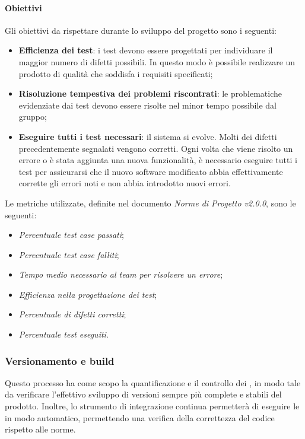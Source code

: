 \paragraph{Obiettivi} \Spazio
Gli obiettivi da rispettare durante lo sviluppo del progetto sono i seguenti:
\begin{itemize}
	\item{\textbf{Efficienza dei test}: i test devono essere progettati per individuare il maggior numero di difetti possibili. In questo modo è possibile realizzare un prodotto di qualità che soddisfa i requisiti specificati;}
	\item{\textbf{Risoluzione tempestiva dei problemi riscontrati}: le problematiche evidenziate dai test devono essere risolte nel minor tempo possibile dal gruppo;}
	\item{\textbf{Eseguire tutti i test necessari}: il sistema si evolve. Molti dei difetti precedentemente segnalati vengono corretti. Ogni volta che viene risolto un errore o è stata aggiunta una nuova funzionalità, è necessario eseguire tutti i test per assicurarsi che il nuovo software modificato abbia effettivamente corrette gli errori noti e non abbia introdotto nuovi errori.}
\end{itemize}
Le metriche utilizzate, definite nel documento \emph{Norme di Progetto v2.0.0}, sono le seguenti:
\begin{itemize}
	\item{\emph{Percentuale test case passati};}
	\item{\emph{Percentuale test case falliti};}
	\item{\emph{Tempo medio necessario al team per risolvere un errore};}
	\item{\emph{Efficienza nella progettazione dei test};}
	\item{\emph{Percentuale di difetti corretti};}
	\item{\emph{Percentuale test eseguiti}.}

\end{itemize}

\subsubsection{Versionamento e build} 
Questo processo ha come scopo la quantificazione e il controllo dei , in modo tale da verificare l'effettivo sviluppo di versioni sempre più complete e stabili del prodotto. Inoltre, lo strumento di integrazione continua  permetterà di eseguire le  in modo automatico, permettendo una verifica della correttezza del codice rispetto alle norme.
